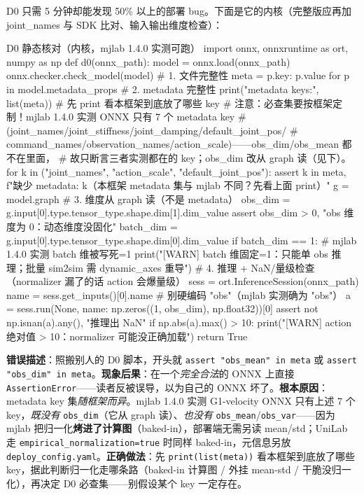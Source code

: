 D0 只需 5 分钟却能发现 50\% 以上的部署 bug。下面是它的内核（完整版应再加 joint\_names 与 SDK 比对、输入输出维度检查）：

\begin{codebox}[Python]{D0 静态核对（内核，mjlab 1.4.0 实测可跑）}
import onnx, onnxruntime as ort, numpy as np
def d0(onnx_path):
    model = onnx.load(onnx_path)
    onnx.checker.check_model(model)                       # 1. 文件完整性
    meta = {p.key: p.value for p in model.metadata_props} # 2. metadata 完整性
    print("metadata keys:", list(meta))                   # 先 print 看本框架到底放了哪些 key
    # 注意：必查集要按框架定制！mjlab 1.4.0 实测 ONNX 只有 7 个 metadata key
    #   (joint_names/joint_stiffness/joint_damping/default_joint_pos/
    #    command_names/observation_names/action_scale)——obs_dim/obs_mean 都不在里面，
    #   故只断言三者实测都在的 key；obs_dim 改从 graph 读（见下）。
    for k in ("joint_names", "action_scale", "default_joint_pos"):
        assert k in meta, f"缺少 metadata: {k}（本框架 metadata 集与 mjlab 不同？先看上面 print）"
    g = model.graph                                        # 3. 维度从 graph 读（不是 metadata）
    obs_dim = g.input[0].type.tensor_type.shape.dim[1].dim_value
    assert obs_dim > 0, "obs 维度为 0：动态维度没固化"
    batch_dim = g.input[0].type.tensor_type.shape.dim[0].dim_value
    if batch_dim == 1:                                     # mjlab 1.4.0 实测 batch 维被写死=1
        print("[WARN] batch 维固定=1：只能单 obs 推理；批量 sim2sim 需 dynamic_axes 重导")
    # 4. 推理 + NaN/量级检查（normalizer 漏了的话 action 会爆量级）
    sess = ort.InferenceSession(onnx_path)
    name = sess.get_inputs()[0].name                      # 别硬编码 "obs"（mjlab 实测确为 "obs"）
    a = sess.run(None, {name: np.zeros((1, obs_dim), np.float32)})[0]
    assert not np.isnan(a).any(), "推理出 NaN"
    if np.abs(a).max() > 10:
        print("[WARN] action 绝对值 > 10：normalizer 可能没正确加载")
    return True
\end{codebox}

\begin{pitfall}
\textbf{错误描述}：照搬别人的 D0 脚本，开头就 \verb|assert "obs_mean" in meta| 或 \verb|assert "obs_dim" in meta|。\textbf{现象后果}：在一个\emph{完全合法}的 ONNX 上直接 \verb|AssertionError|——读者反被误导，以为自己的 ONNX 坏了。\textbf{根本原因}：metadata key 集\emph{随框架而异}。mjlab 1.4.0 实测 G1-velocity ONNX 只有上述 7 个 key，\emph{既没有} \verb|obs_dim|（它从 graph 读）、\emph{也没有} \verb|obs_mean|/\verb|obs_var|——因为 mjlab 把归一化\textbf{烤进了计算图}（baked-in），部署端无需另读 mean/std；UniLab 走 \verb|empirical_normalization=true| 时同样 baked-in，元信息另放 \verb|deploy_config.yaml|。\textbf{正确做法}：先 \verb|print(list(meta))| 看本框架到底放了哪些 key，据此判断归一化走哪条路（baked-in 计算图 / 外挂 mean-std / 干脆没归一化），再决定 D0 必查集——别假设某个 key 一定存在。
\end{pitfall}

